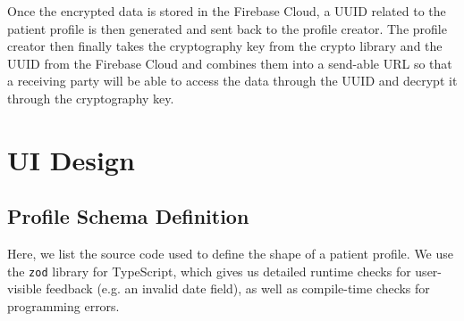 \documentclass[11pt,letterpaper]{article}
\begin{document}
Once the encrypted data is stored in the Firebase Cloud, a UUID related to the patient profile is then generated and sent back to the profile creator. The profile creator then finally takes the cryptography key from the crypto library and the UUID from the Firebase Cloud and combines them into a send-able URL so that a receiving party will be able to access the data through the UUID and decrypt it through the cryptography key. 

\section{UI Design}




\newpage
\vspace*{2in}
\newpage
\begin{appendices}

\section{Profile Schema Definition}
\label{appendix:profile}

Here, we list the source code used to define the shape of a patient profile. We use the \verb|zod| library for TypeScript, which gives us detailed runtime checks for user-visible feedback (e.g. an invalid date field), as well as compile-time checks for programming errors.

\inputminted{typescript}{profile.ts}



\end{appendices}
\end{document}
